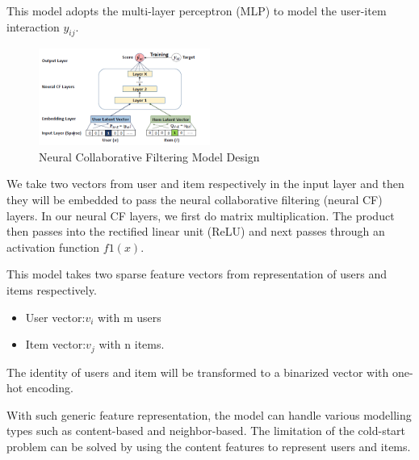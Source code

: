 \documentclass[final]{cvpr}
\begin{document}
This model adopts the multi-layer perceptron (MLP) to model the user-item interaction $y_{ij}$. 

\linebreak

\begin{figure}[h]
	\includegraphics[width=0.5\textwidth]{./NCF-network.PNG}
	\caption{Neural Collaborative Filtering Model Design}
\end{figure}

We take two vectors from user and item respectively in the input layer and then they will be embedded to pass the neural collaborative filtering (neural CF) layers. In our neural CF layers, we first do matrix multiplication. The product then passes into the rectified linear unit (ReLU) and next passes through an activation function $f1(x)$.


This model takes two sparse feature vectors from representation of users and items respectively. 

\begin{itemize}
	\item User vector:$v_i$ with m users 
	\item Item vector:$v_j$ with n items.

\end{itemize}
The identity of users and item will be transformed to a binarized vector with one-hot encoding. 

With such generic feature representation, the model can handle various modelling types such as content-based and neighbor-based. The limitation of the cold-start problem can be solved by using the content features to represent users and items.

\end{document}
